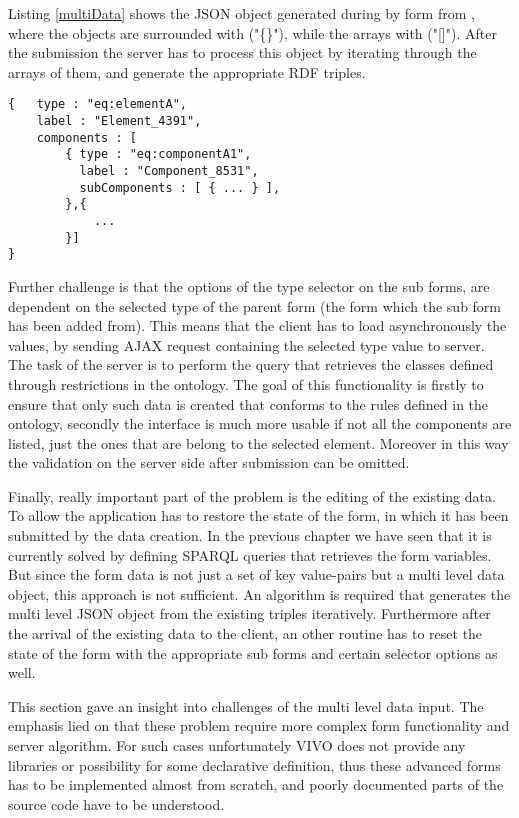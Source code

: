Listing \ref{multiData} shows the JSON object generated during by form from , where the objects are surrounded with ("\{\}"), while the arrays with ("[]"). After the submission the server has to process this object by iterating through the arrays of them, and generate the appropriate RDF triples.

\begin{lstlisting}[basicstyle=\footnotesize, frame=single, caption={Multi level form data in JSON}, label=multiData, captionpos=b, belowskip=1em, aboveskip=2em]
{	type : "eq:elementA",
	label : "Element_4391",
	components : [
		{ type : "eq:componentA1",
		  label : "Component_8531",	
		  subComponents : [ { ... } ],
		},{ 
			... 
		}]
}
\end{lstlisting}

Further challenge is that the options of the type selector on the sub forms, are dependent on the selected type of the parent form (the form which the sub form has been added from). This means that the client has to load asynchronously the values, by sending AJAX request containing the selected type value to server. The task of the server is to perform the query that retrieves the classes defined through restrictions in the ontology. The goal of this functionality is firstly to ensure that only such data is created that conforms to the rules defined in the ontology, secondly the interface is much more usable if not all the components are listed, just the ones that are belong to the selected element. Moreover in this way the validation on the server side after submission can be omitted.

Finally, really important part of the problem is the editing of the existing data. To allow the application has to restore the state of the form, in which it has been submitted by the data creation. In the previous chapter we have seen that it is currently solved by defining  SPARQL queries that retrieves the form variables. But since the form data is not just a set of key value-pairs but a multi level data object, this approach is not sufficient. An algorithm is required that generates the multi level JSON object from the existing triples iteratively. Furthermore after the arrival of the existing data to the client, an other routine has to reset the state of the form with the appropriate sub forms and certain selector options as well.

This section gave an insight into challenges of the multi level data input. The emphasis lied on that these problem require more complex form functionality and server algorithm. For such cases unfortunately VIVO does not provide any libraries or possibility for some declarative definition, thus these advanced forms has to be implemented almost from scratch, and poorly documented parts of the source code have to be understood.

